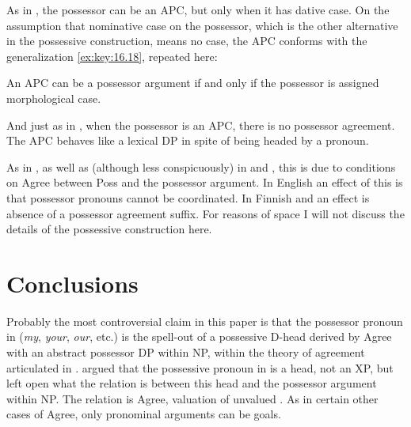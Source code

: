 \documentclass[output=paper]{langsci/langscibook}
\begin{document}
As in , the possessor can be an \gls{APC}, but only when it has dative case.
On the assumption that nominative case on the possessor,
which is the other alternative in the  possessive construction, means
no case,  the  \gls{APC} conforms with the generalization
\eqref{ex:key:16.18}, repeated here:

\ea\label{ex:key:16.47}
    An \gls{APC} can be a possessor argument if and only if the possessor is assigned
    morphological case.
\z

And just as in , when the possessor is an \gls{APC}, there is no possessor
agreement. The \gls{APC} behaves like a lexical DP in spite of being headed by
a pronoun.\newpage

\ea\label{ex:key:16.48}
\z

As in , as well as (although less conspicuously) in  and ,
this is due to conditions on Agree between Poss and the possessor argument. In
English an effect of this is that possessor pronouns cannot be coordinated. In
Finnish and  an effect is absence of a possessor agreement suffix. For
reasons of space I will not discuss the details of the  possessive
construction here.

\section{Conclusions}\label{sec:key:16.4}

Probably the most controversial claim in this paper is that the possessor
pronoun in  (\emph{my}, \emph{your}, \emph{our}, etc.) is the spell-out
of a possessive D-head derived by Agree with an abstract possessor DP within
NP, within the theory of agreement articulated in
\textcite{Roberts2010,Roberts2010b}.  \citet{Delsing1998} argued that the
possessive pronoun in  is a head, not an XP, but left open what the
relation is between this head and the possessor argument within NP. The
relation is Agree, valuation of unvalued . As in certain other cases
of Agree, only pronominal arguments can be goals.
\end{document}
